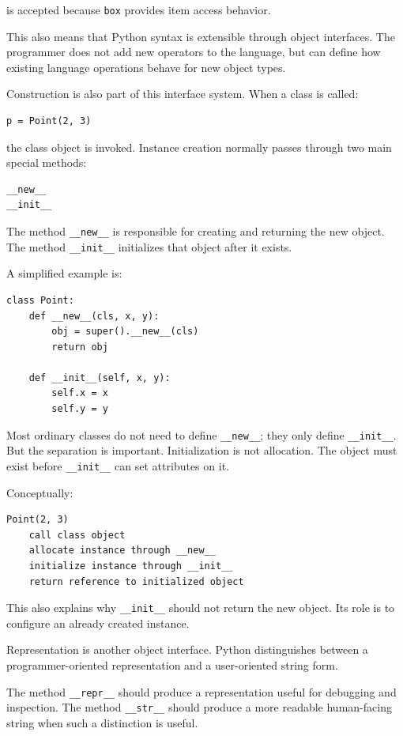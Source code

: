 is accepted because \texttt{box} provides item access behavior.

This also means that Python syntax is extensible through object interfaces. The programmer does not add new operators to the language, but can define how existing language operations behave for new object types.

Construction is also part of this interface system. When a class is called:

\begin{verbatim}
p = Point(2, 3)
\end{verbatim}

the class object is invoked. Instance creation normally passes through two main special methods:

\begin{verbatim}
__new__
__init__
\end{verbatim}

The method \texttt{\_\_new\_\_} is responsible for creating and returning the new object. The method \texttt{\_\_init\_\_} initializes that object after it exists.

A simplified example is:

\begin{verbatim}
class Point:
    def __new__(cls, x, y):
        obj = super().__new__(cls)
        return obj

    def __init__(self, x, y):
        self.x = x
        self.y = y
\end{verbatim}

Most ordinary classes do not need to define \texttt{\_\_new\_\_}; they only define \texttt{\_\_init\_\_}. But the separation is important. Initialization is not allocation. The object must exist before \texttt{\_\_init\_\_} can set attributes on it.

Conceptually:

\begin{verbatim}
Point(2, 3)
    call class object
    allocate instance through __new__
    initialize instance through __init__
    return reference to initialized object
\end{verbatim}

This also explains why \texttt{\_\_init\_\_} should not return the new object. Its role is to configure an already created instance.

Representation is another object interface. Python distinguishes between a programmer-oriented representation and a user-oriented string form.

The method \texttt{\_\_repr\_\_} should produce a representation useful for debugging and inspection. The method \texttt{\_\_str\_\_} should produce a more readable human-facing string when such a distinction is useful.


